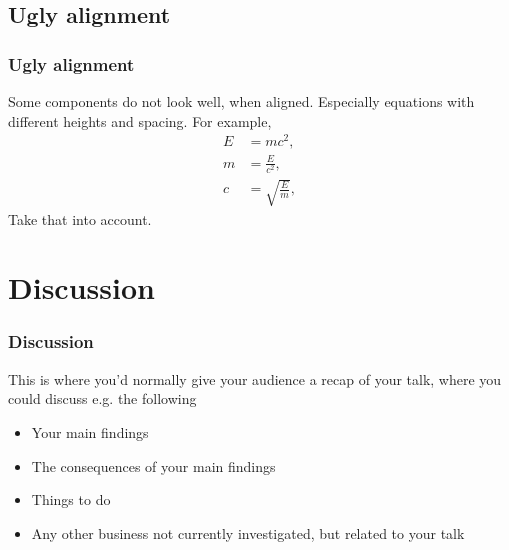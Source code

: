 \documentclass[aspectratio=169]{beamer} %
\begin{document}
\subsection{Ugly alignment}
\begin{frame}
\frametitle{Ugly alignment}
Some components do not look well, when aligned. Especially equations with different heights and spacing. For example, 
\begin{align}
E&=mc^2,\\
m&=\frac{E}{c^2},\\
c&=\sqrt{\frac{E}{m}},
\end{align}
Take that into account. 
\end{frame}

\section{Discussion}
\begin{frame}
\frametitle{Discussion}
This is where you'd normally give your audience a recap of your talk, where you could discuss e.g. the following
\begin{itemize}
\item Your main findings
\item The consequences of your main findings
\item Things to do
\item Any other business not currently investigated, but related to your talk
\end{itemize}
\end{frame}
\end{document}
